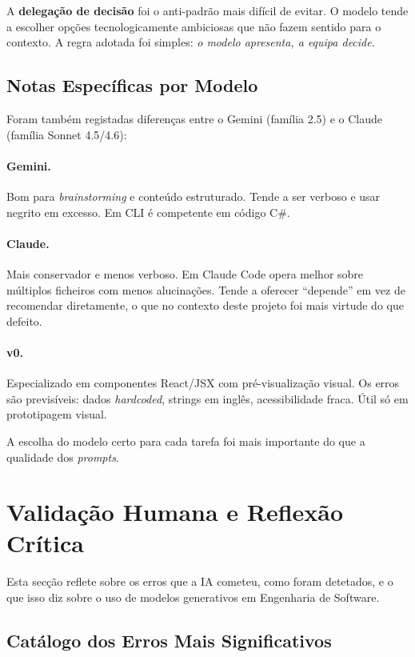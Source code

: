 A \textbf{delegação de decisão} foi o anti-padrão mais difícil de evitar. O modelo tende a escolher opções tecnologicamente ambiciosas que não fazem sentido para o contexto. A regra adotada foi simples: \emph{o modelo apresenta, a equipa decide}.

\subsection{Notas Específicas por Modelo}\label{subsec:ia_prompts_modelos}

Foram também registadas diferenças entre o Gemini (família 2.5) e o Claude (família Sonnet 4.5/4.6):

\paragraph{Gemini.} Bom para \textit{brainstorming} e conteúdo estruturado. Tende a ser verboso e usar negrito em excesso. Em CLI é competente em código C\#.

\paragraph{Claude.} Mais conservador e menos verboso. Em Claude Code opera melhor sobre múltiplos ficheiros com menos alucinações. Tende a oferecer ``depende'' em vez de recomendar diretamente, o que no contexto deste projeto foi mais virtude do que defeito.

\paragraph{v0.} Especializado em componentes React/JSX com pré-visualização visual. Os erros são previsíveis: dados \textit{hardcoded}, strings em inglês, acessibilidade fraca. Útil só em prototipagem visual.

A escolha do modelo certo para cada tarefa foi mais importante do que a qualidade dos \textit{prompts}.

\section{Validação Humana e Reflexão Crítica}\label{sec:ia_validacao}

Esta secção reflete sobre os erros que a IA cometeu, como foram detetados, e o que isso diz sobre o uso de modelos generativos em Engenharia de Software.

\subsection{Catálogo dos Erros Mais Significativos}\label{subsec:ia_val_erros}

